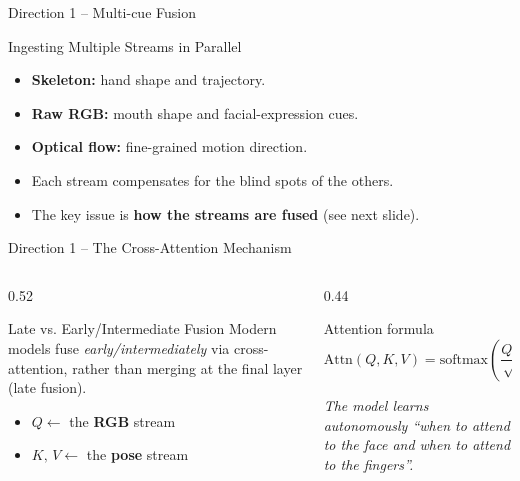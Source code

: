 \documentclass[aspectratio=169]{beamer}
\begin{document}
\begin{frame}{Direction 1 -- Multi-cue Fusion}
    \begin{block}{Ingesting Multiple Streams in Parallel}
        \begin{itemize}
            \item \textbf{Skeleton:} hand shape and trajectory.
            \item \textbf{Raw RGB:} mouth shape and facial-expression cues.
            \item \textbf{Optical flow:} fine-grained motion direction.
        \end{itemize}
    \end{block}
    \vspace{0.3cm}
    \begin{itemize}
        \item Each stream compensates for the blind spots of the others.
        \item The key issue is \textbf{how the streams are fused} (see next slide).
    \end{itemize}
\end{frame}

\begin{frame}{Direction 1 -- The Cross-Attention Mechanism}
    \begin{columns}[T]
        \begin{column}{0.52\textwidth}
            \begin{block}{Late vs. Early/Intermediate Fusion}
                Modern models fuse \emph{early/intermediately} via cross-attention, rather than merging at the final layer (late fusion).
            \end{block}
            \vspace{0.2cm}
            \begin{itemize}
                \item $Q \leftarrow$ the \textbf{RGB} stream
                \item $K,\,V \leftarrow$ the \textbf{pose} stream
            \end{itemize}
        \end{column}
        \begin{column}{0.44\textwidth}
            \begin{exampleblock}{Attention formula}
                \[
                    \mathrm{Attn}(Q,K,V)=\mathrm{softmax}\!\left(\frac{QK^{\top}}{\sqrt{d_k}}\right)V
                \]
            \end{exampleblock}
            \vspace{0.1cm}
            \centering\small\textit{The model learns autonomously ``when to attend to the face and when to attend to the fingers''.}
        \end{column}
    \end{columns}
\end{frame}
\end{document}
